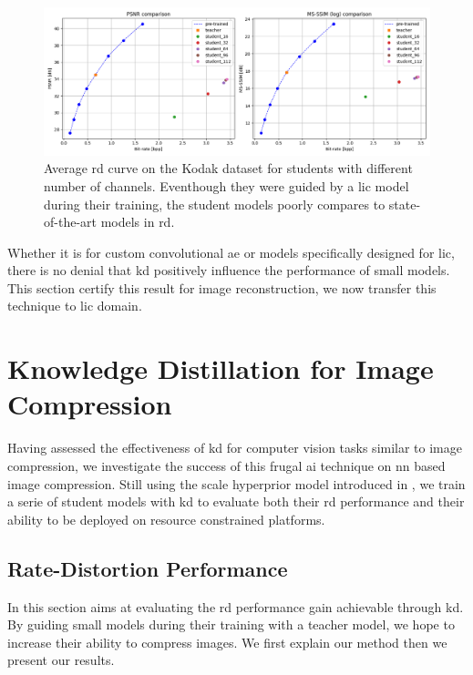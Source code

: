 \begin{figure}
    \centering
    \includegraphics[width=15cm]{img/kd_ae_rd.png}
    \caption[Average \acrshort{rd} curve on the Kodak dataset for students with different number of channels.]{Average \acrshort{rd} curve on the Kodak dataset for students with different number of channels. Eventhough they were guided by a \acrshort{lic} model during their training, the student models poorly compares to state-of-the-art models in \acrshort{rd}.}
    \label{kd_ae_2}
\end{figure}

Whether it is for custom convolutional \acrshort{ae} or models specifically designed for \acrshort{lic}, there is no denial that \acrshort{kd} positively influence the performance of small models. This section certify this result for image reconstruction, we now transfer this technique to \acrshort{lic} domain.

\section{Knowledge Distillation for Image Compression}
Having assessed the effectiveness of \acrshort{kd} for computer vision tasks similar to image compression, we investigate the success of this frugal \acrshort{ai} technique on \acrshort{nn} based image compression. Still using the scale hyperprior model introduced in \cite{ballé2018variationalimagecompressionscale}, we train a serie of student models with \acrshort{kd} to evaluate both their \acrshort{rd} performance and their ability to be deployed on resource constrained platforms.

\subsection{Rate-Distortion Performance}
In this section aims at evaluating the \acrshort{rd} performance gain achievable through \acrshort{kd}. By guiding small models during their training with a teacher model, we hope to increase their ability to compress images. We first explain our method then we present our results.

